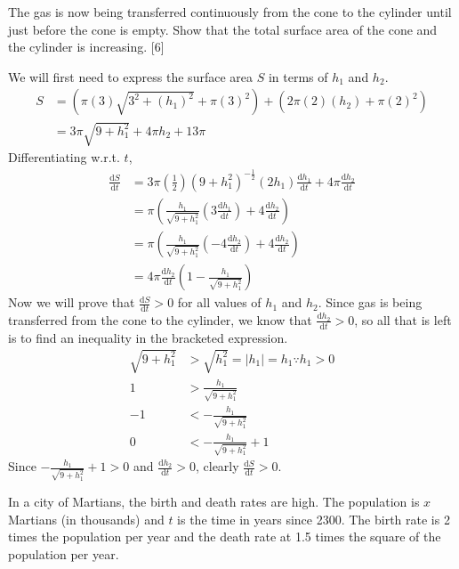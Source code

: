 \documentclass[12pt, a4 paper]{article}
\begin{document}
\begin{outline}[enumerate]
 \2 The gas is now being transferred continuously from the cone to the cylinder until just before the cone is empty. Show that the total surface area of the cone and the cylinder is increasing. \hfill[6]
 \begin{answer}
  We will first need to express the surface area $S$ in terms of $h_{1}$ and $h_{2}$.
  \begin{align*}
    S &= (\pi (3)\sqrt{3^2+(h_{1})^2}+\pi(3)^2) + (2\pi (2)(h_{2}) + \pi(2)^2)\\
    &= 3\pi \sqrt{9+h_{1}^2} + 4 \pi h_{2} + 13\pi
  \end{align*}
  Differentiating w.r.t. $t$,
  \begin{align*}
    \frac{\mathrm{d}S}{\mathrm{d}t} &= 3\pi \left(\frac{1}{2}\right) (9+h_{1}^2)^{-\frac{1}{2}}(2h_{1})\frac{\mathrm{d}h_{1}}{\mathrm{d}t} + 4 \pi \frac{\mathrm{d}h_{2}}{\mathrm{d}t} \\
    &= \pi \left(\frac{h_{1}}{\sqrt{9+h_{1}^2}}\left(3\frac{\mathrm{d}h_{1}}{\mathrm{d}t}\right)+4\frac{\mathrm{d}h_{2}}{\mathrm{d}t}\right) \\
    &= \pi \left(\frac{h_{1}}{\sqrt{9+h_{1}^2}}\left(-4\frac{\mathrm{d}h_{2}}{\mathrm{d}t}\right)+4\frac{\mathrm{d}h_{2}}{\mathrm{d}t}\right) \\
    &= 4\pi \frac{\mathrm{d}h_{2}}{\mathrm{d}t}\left(1-\frac{h_{1}}{\sqrt{9+h_{1}^2}}\right)
  \end{align*}
  Now we will prove that $\frac{\mathrm{d}S}{\mathrm{d}t}>0$ for all values of $h_{1}$ and $h_{2}$. Since gas is being transferred from the cone to the cylinder, we know that $\frac{\mathrm{d}h_{2}}{\mathrm{d}t}>0$, so all that is left is to find an inequality in the bracketed expression.
  \begin{align*}
    \sqrt{9+h_{1}^2} &> \sqrt{h_{1}^2} = |h_{1}| = h_{1} \because h_{1} > 0 \\
    1 &> \frac{h_{1}}{\sqrt{9+h_{1}^2}} \\
    -1 &< -\frac{h_{1}}{\sqrt{9+h_{1}^2}} \\
    0 &< -\frac{h_{1}}{\sqrt{9+h_{1}^2}}+1
  \end{align*}
  Since $-\frac{h_{1}}{\sqrt{9+h_{1}^2}}+1>0$ and $\frac{\mathrm{d}h_{2}}{\mathrm{d}t}>0$, clearly $\frac{\mathrm{d}S}{\mathrm{d}t}>0$.
 \end{answer}
 \1 In a city of Martians, the birth and death rates are high. The population is $x$ Martians (in thousands) and $t$ is the time in years since 2300. The birth rate is 2 times the population per year and the death rate at 1.5 times the square of the population per year. %


\end{outline}
\end{document}

